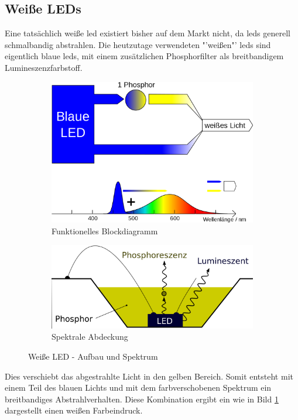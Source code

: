 \documentclass[11pt]{scrartcl}
\begin{document}
\subsection{Weiße LEDs}
Eine tatsächlich weiße \ac{led} existiert bisher auf dem Markt nicht, da \ac{led}s generell schmalbandig abstrahlen. Die heutzutage
verwendeten "'weißen"' \ac{led}s sind eigentlich blaue \ac{led}s, mit einem zusätzlichen Phosphorfilter als breitbandigem
Lumineszenzfarbstoff.
\begin{figure}[H]
    \centering
    \begin{subfigure}[b]{0.49\textwidth}
        \includegraphics[width=\textwidth]{images/LED_weiss_P_blau.png}
        \caption{Funktionelles Blockdiagramm}
    \end{subfigure}
    \hfill 
    \begin{subfigure}[b]{0.49\textwidth}
        \includegraphics[width=\textwidth]{images/LED_weiss_phosphor.png}
        \caption{Spektrale Abdeckung}
    \end{subfigure}
    \caption[Weiße LED - Aufbau und Spektrum]{Weiße LED - Aufbau und Spektrum \cite{wikiLed}}\label{fig:WhiteLED}
\end{figure}
\noindent
Dies verschiebt das abgestrahlte Licht in den gelben Bereich. Somit entsteht mit einem Teil des blauen Lichts und mit dem farbverschobenen
Spektrum ein breitbandiges Abstrahlverhalten. Diese Kombination ergibt ein wie in Bild \ref{fig:WhiteLED} dargestellt einen weißen
Farbeindruck.
\clearpage
\end{document}
